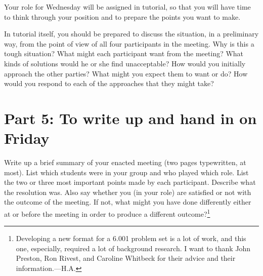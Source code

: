 Your role for Wednesday will be assigned in tutorial, so that you will
have time to think through your position and to prepare the points you
want to make.

In tutorial itself, you should be prepared to discuss the situation,
in a preliminary way, from the point of view of all four participants
in the meeting.  Why is this a tough situation? What might each
participant want from the meeting?  What kinds of solutions would he
or she find unacceptable?  How would you initially approach the other
parties?  What might you expect them to want or do?  How would you
respond to each of the approaches that they might take?


\section{Part 5:  To write up and hand in on Friday}

Write up a brief summary of your enacted meeting (two pages
typewritten, at most).  List which students were in your group and who
played which role.  List the two or three most important points made
by each participant.  Describe what the resolution was.  Also say
whether you (in your role) are satisfied or not with the outcome of
the meeting.  If not, what might you have done differently either at
or before the meeting in order to produce a different
outcome?\footnote{Developing a new format for a 6.001 problem set is a
lot of work, and this one, especially, required a lot of background
research. I want to thank John Preston, Ron Rivest, and Caroline
Whitbeck for their advice and their information.---H.A.}




